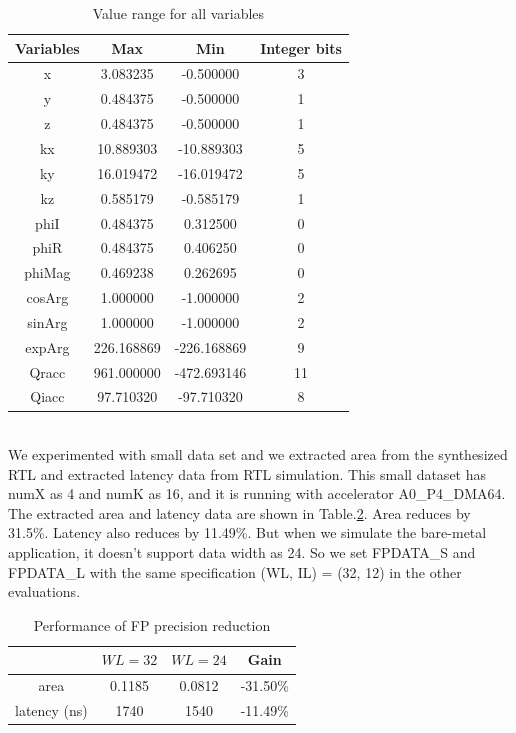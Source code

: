 \documentclass{sig-alternate}
\begin{document}
\begin{table}[ht!]
    \centering
    \begin{tabular}{c|c|c|c}
    \hline \hline
   Variables &       Max&    Min& Integer bits\\
   \hline \hline
 x&     3.083235        &-0.500000& 3 \\
 y&     0.484375        &-0.500000& 1 \\
 z&     0.484375        &-0.500000& 1 \\
 kx&    10.889303       &-10.889303& 5 \\
 ky&    16.019472       &-16.019472& 5 \\
 kz&    0.585179        &-0.585179& 1\\
 phiI   &0.484375       &0.312500& 0 \\
 phiR   &0.484375       &0.406250& 0 \\
 phiMag &0.469238       &0.262695& 0 \\
 cosArg&        1.000000        &-1.000000& 2\\
 sinArg &1.000000       &-1.000000& 2 \\
 \hline
 expArg &226.168869     &-226.168869& 9 \\
 Qracc  &961.000000     &-472.693146& 11 \\
 Qiacc  &97.710320      &-97.710320& 8 \\
\hline \hline
    \end{tabular}
    \caption{Value range for all variables}
    \label{tab-8}
\end{table}




\\
We experimented with small data set and we extracted area from the synthesized RTL and extracted latency data from RTL simulation. This small dataset has numX as 4 and numK as 16, and it is running with accelerator A0\_P4\_DMA64. The extracted area and latency data are shown in Table.\ref{tab-3}. Area reduces by 31.5\%. Latency also reduces by 11.49\%. But when we simulate the bare-metal application, it doesn't support data width as 24. So we set FPDATA\_S and FPDATA\_L with the same specification (WL, IL) = (32, 12) in the other evaluations.\\
\begin{table}[h!]
    \centering
    \begin{tabular}{c|c|c|c}
    \hline
        & $WL=32$ & $WL=24$ &  Gain \\
        \hline
   area &  0.1185  & 0.0812   & -31.50\% \\ 
latency (ns) &  1740 &  1540  & -11.49\% \\
    \hline
    \end{tabular}
    \caption{Performance of FP precision reduction}
    \label{tab-3}
\end{table}
\\ \\ 
\end{document}
